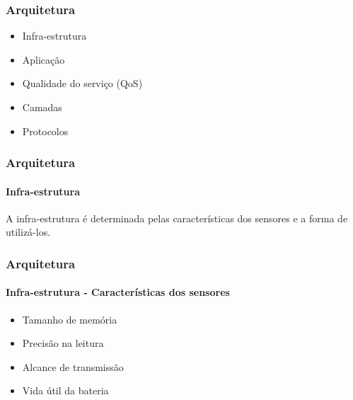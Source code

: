 \documentclass[notes]{beamer}
\begin{document}
\begin{frame}
\frametitle{Arquitetura}

\begin{block}

\begin{itemize}

\item Infra-estrutura \pause

\item Aplicação \pause

\item Qualidade do serviço (QoS) \pause

\item Camadas \pause

\item Protocolos 

\end{itemize}

\end{block}

\end{frame}

\begin{frame}
\frametitle{Arquitetura}
\framesubtitle{Infra-estrutura}

\begin{block}

A infra-estrutura é determinada pelas características dos sensores e a forma de utilizá-los.

\end{block}

\end{frame}

\begin{frame}
\frametitle{Arquitetura}
\framesubtitle{Infra-estrutura - Características dos sensores}

\begin{block}

\begin{itemize}

\item Tamanho de memória \pause
\item Precisão na leitura \pause
\item Alcance de transmissão \pause
\item Vida útil da bateria 

\end{itemize}

\end{block}

\end{frame}
\end{document}

